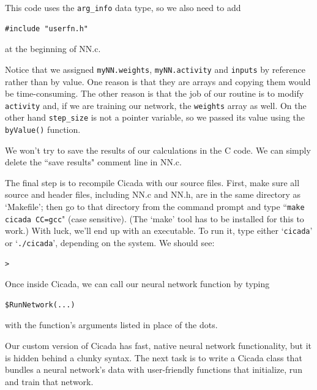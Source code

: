 \documentclass{article}
\newenvironment{code}{
       \begin{list}{}{
               \setlength{\leftmargin}{.4in}
               \setlength{\rightmargin}{0in}
               \setlength{\topsep}{.2in}
       }
       \small
       \item[] }
       { \end{list}   }
\begin{document}
\noindent This code uses the \verb#arg_info# data type, so we also need to add

\begin{code} \begin{verbatim}
#include "userfn.h"
\end{verbatim} \end{code}

\noindent at the beginning of NN.c.

Notice that we assigned \verb#myNN.weights#, \verb#myNN.activity# and \verb#inputs# by reference rather than by value.  One reason is that they are arrays and copying them would be time-consuming.  The other reason is that the job of our routine is to modify \verb#activity# and, if we are training our network, the \verb#weights# array as well.  On the other hand \verb#step_size# is not a pointer variable, so we passed its value using the \verb#byValue()# function.

We won't try to save the results of our calculations in the C code.  We can simply delete the ``save results" comment line in NN.c.

The final step is to recompile Cicada with our source files.  First, make sure all source and header files, including NN.c and NN.h, are in the same directory as `Makefile'; then go to that directory from the command prompt and type ``\verb#make cicada CC=gcc#" (case sensitive).  (The `make' tool has to be installed for this to work.)  With luck, we'll end up with an executable.  To run it, type either `\verb#cicada#' or `\verb#./cicada#', depending on the system.  We should see:

\begin{code} \begin{verbatim}
> 
\end{verbatim} \end{code}

Once inside Cicada, we can call our neural network function by typing

\begin{code} \begin{verbatim}
$RunNetwork(...)
\end{verbatim} \end{code}

\noindent with the function's arguments listed in place of the dots.

Our custom version of Cicada has fast, native neural network functionality, but it is hidden behind a clunky syntax.  The next task is to write a Cicada class that bundles a neural network's data with user-friendly functions that initialize, run and train that network.
\end{document}
